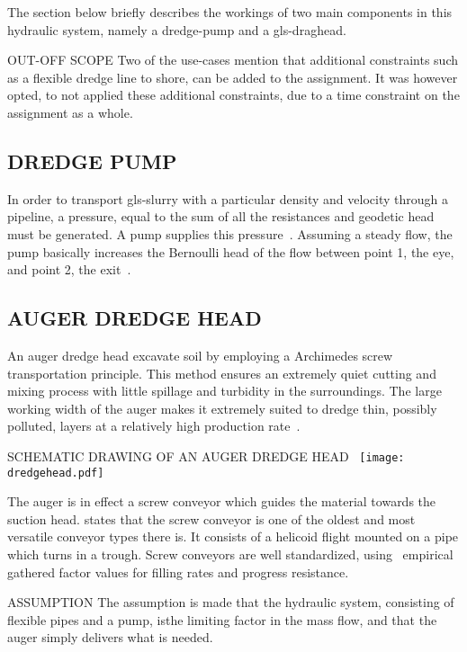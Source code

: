 The section below briefly describes the workings of two main components in this hydraulic system, namely a dredge-pump
and a \gls{gls-draghead}.

\begin{RoyalNote}{OUT-OFF SCOPE}
  Two of the use-cases mention that additional constraints such as a flexible dredge line to shore, can be added to the
  assignment. It was however opted, to not applied these additional constraints, due to a time constraint on the
  assignment as a whole.
\end{RoyalNote}

\subsection{DREDGE PUMP}
In order to transport \gls{gls-slurry} with a particular density and velocity through a pipeline, a pressure, equal to
the sum of all the resistances and geodetic head must be generated. A pump supplies this
pressure~\cite{van_den_berg_ihc_2013}. Assuming a steady flow, the pump basically increases the Bernoulli head of the
flow between point 1, the eye, and point 2, the exit~\cite{white_fluid_2011}.

\subsection{AUGER DREDGE HEAD}
An auger dredge head excavate soil by employing a Archimedes screw transportation principle. This method ensures an
extremely quiet cutting and mixing process with little spillage and turbidity in the surroundings. The large working
width of the auger makes it extremely suited to dredge thin, possibly polluted, layers at a relatively high production
rate~\cite{van_der_schrieck_dredging_2014}.

\begin{RoyalFigure}[htb]{SCHEMATIC DRAWING OF AN AUGER DREDGE HEAD~\cite{wetering_ihc_mti_crawler_dredger_final_report_2018} }
  \texttt{[image: dredgehead.pdf]}
\end{RoyalFigure}

The auger is in effect a screw conveyor which guides the material towards the suction head. \citet{perry_2007} states
that the screw conveyor is one of the oldest and most versatile conveyor types there is. It consists of a helicoid
flight mounted on a pipe which turns in a trough. Screw conveyors are well standardized,
using~\citet{international_standard_iso_neniso_1981} empirical gathered factor values for filling rates and progress
resistance.

\begin{RoyalNote}{ASSUMPTION}
	The assumption is made that the hydraulic system, consisting of flexible pipes and a pump, isthe limiting factor in the
	mass flow, and that the auger simply delivers what is needed.
\end{RoyalNote}
